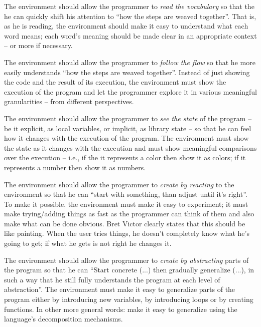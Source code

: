 \documentclass{./llncs2e/llncs}
\begin{document}
The environment should allow the programmer to \emph{read the vocabulary} so that the he can quickly shift his attention to ``how the steps are weaved together''. That is, as he is reading, the environment should make it easy to understand what each word means; each word's meaning should be made clear in an appropriate context -- or more if necessary.

The environment should allow the programmer to \emph{follow the flow} so that he more easily understands ``how the steps are weaved together''. Instead of just showing the code and the result of its execution, the environment must show the execution of the program and let the programmer explore it in various meaningful granularities -- from different perspectives.

The environment should allow the programmer to \emph{see the state} of the program -- be it explicit, as local variables, or implicit, as library state -- so that he can feel how it changes with the execution of the program. The environment must show the state as it changes with the execution and must show meaningful comparisons over the execution -- i.e., if the it represents a color then show it as colors; if it represents a number then show it as numbers.

The environment should allow the programmer to \emph{create by reacting} to the environment so that he can ``start with something, than adjust until it's right''. To make it possible, the environment must make it easy to experiment; it must make trying/adding things as fast as the programmer can think of them and also make what can be done obvious. Bret Victor clearly states that this should be like painting. When the user tries things, he doesn't completely know what he's going to get; if what he gets is not right he changes it.

The environment should allow the programmer to \emph{create by abstracting} parts of the program so that he can ``Start concrete (...) then gradually generalize (...), in such a way that he still fully understands the program at each level of abstraction''. The environment must make it easy to generalize parts of the program either by introducing new variables, by introducing loops or by creating functions. In other more general words: make it easy to generalize using the language's decomposition mechanisms. 
\end{document}
